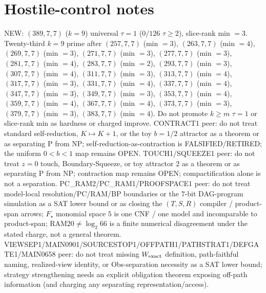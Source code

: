 \documentclass[11pt]{article}
\begin{document}
\section*{Hostile-control notes}
NEW: $(389,7,7)$ ($k{=}9$) universal $\tau{=}1$ ($0/126$ $\tau{\ge}2$), slice-rank min $=3$.
Twenty-third $k{=}9$ prime after $(257,7,7)$ (min $=3$), $(263,7,7)$ (min $=4$), $(269,7,7)$ (min $=3$), $(271,7,7)$ (min $=3$), $(277,7,7)$ (min $=3$), $(281,7,7)$ (min $=4$), $(283,7,7)$ (min $=2$), $(293,7,7)$ (min $=3$), $(307,7,7)$ (min $=4$), $(311,7,7)$ (min $=3$), $(313,7,7)$ (min $=4$), $(317,7,7)$ (min $=3$), $(331,7,7)$ (min $=4$), $(337,7,7)$ (min $=4$), $(347,7,7)$ (min $=3$), $(349,7,7)$ (min $=3$), $(353,7,7)$ (min $=4$), $(359,7,7)$ (min $=4$), $(367,7,7)$ (min $=4$), $(373,7,7)$ (min $=3$), $(379,7,7)$ (min $=3$), $(383,7,7)$ (min $=4$).
Do not promote $k{\ge}m$ $\tau{=}1$ or slice-rank min as hardness or charged improve.
CONTRACT1 peer: do not treat standard self-reduction, $K\mapsto K+1$, or the toy $b{=}1/2$ attractor as a theorem or as separating P from NP;
self-reduction-as-contraction is FALSIFIED/RETIRED; the uniform $0{<}b{<}1$ map remains OPEN.
TOUCH1/SQUEEZE1 peer: do not treat $z{=}0$ touch, Boundary-Squeeze, or toy attractor $2$ as a theorem or as separating P from NP;
contraction map remains OPEN; compactification alone is not a separation.
PC\_RAM2/PC\_RAM1/PROOFSPACE1 peer: do not treat model-local resolution/PC/RAM/BP boundaries or the $7$-bit DAG-program simulation as a SAT lower bound
or as closing the $(T,S,R)$ compiler / product-span arrows; $F_\star$ monomial space $5$ is one CNF / one model and incomparable to product-span;
RAM$20\neq\log_2 66$ is a finite numerical disagreement under the stated charge, not a general theorem.
VIEWSEP1/MAIN0901/SOURCESTOP1/OFFPATH1/PATHSTRAT1/DEFGATE1/MAIN0658 peer: do not treat missing $W_{\rm exact}$ definition,
path-faithful naming, realized-view identity, or Obs-separation necessity as a SAT lower bound;
strategy strengthening needs an explicit obligation theorem exposing off-path information
(and charging any separating representation/access).
\end{document}
